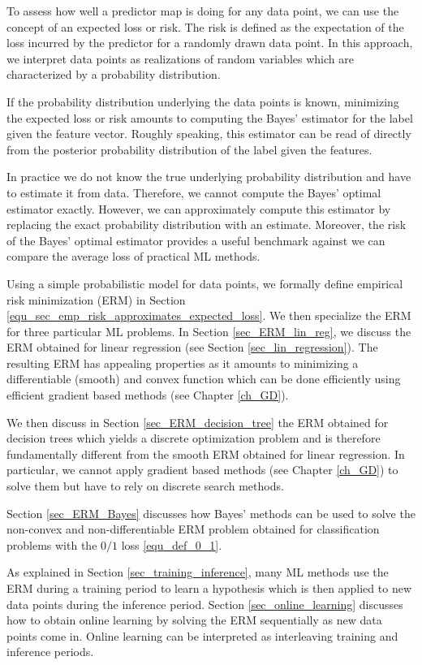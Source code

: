 \documentclass[12pt]{report}
\begin{document}
To assess how well a predictor map is doing for any data point, 
we can use the concept of an expected loss or risk. The risk is 
defined as the expectation of the loss incurred by the predictor 
for a randomly drawn data point. In this approach, we interpret 
data points as realizations of random variables which are 
characterized by a probability distribution. 

If the probability distribution underlying the data points is known, 
minimizing the expected loss or risk amounts to computing the 
Bayes' estimator for the label given the feature vector. 
Roughly speaking, this estimator can be read of directly from the 
posterior probability distribution of the label given the features. 

In practice we do not know the true underlying probability 
distribution and have to estimate it from data. Therefore, we cannot 
compute the Bayes' optimal estimator exactly. However, we can 
approximately compute this estimator by replacing the exact probability 
distribution with an estimate. Moreover, the risk of the Bayes' optimal 
estimator provides a useful benchmark against we can compare the 
average loss of practical ML methods. 

Using a simple probabilistic model for data points, we formally define 
empirical risk minimization (ERM) in Section \eqref{equ_sec_emp_risk_approximates_expected_loss}. 
We then specialize the ERM for three particular ML problems. In Section \ref{sec_ERM_lin_reg}, 
we discuss the ERM obtained for linear regression (see Section \ref{sec_lin_regression}). 
The resulting ERM has appealing properties as it amounts to 
minimizing a differentiable (smooth) and convex function which 
can be done efficiently using efficient gradient based methods (see Chapter \ref{ch_GD}). 

We then discuss in Section \ref{sec_ERM_decision_tree} the ERM obtained for decision trees 
which yields a discrete optimization problem and is therefore fundamentally different from the 
smooth ERM obtained for linear regression. In particular, we cannot apply gradient based 
methods (see Chapter \ref{ch_GD}) to solve them but have to rely on discrete search methods. 

Section \ref{sec_ERM_Bayes} discusses how Bayes' methods can be used to solve 
the non-convex and non-differentiable ERM problem obtained for classification 
problems with the $0/1$ loss \eqref{equ_def_0_1}. 

As explained in Section \ref{sec_training_inference}, many ML methods 
use the ERM during a training period to learn a hypothesis which is 
then applied to new data points during the inference period. 
Section \ref{sec_online_learning} discusses how to obtain online 
learning by solving the ERM sequentially as new data points come in. 
Online learning can be interpreted as interleaving training and inference 
periods. 
\end{document}
